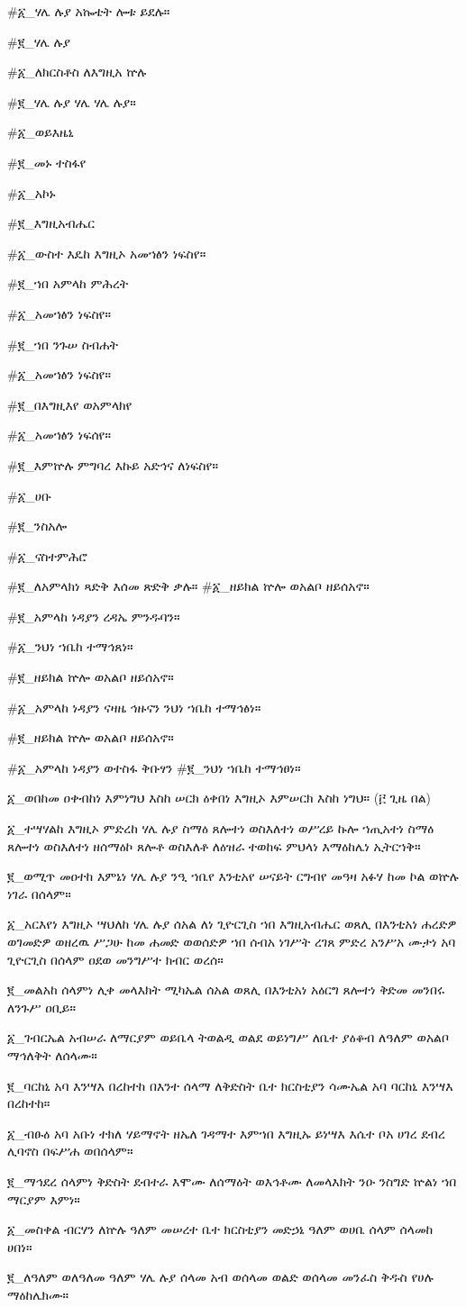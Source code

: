 #፩_ሃሌ ሉያ አኰቴት ሎቱ ይደሉ።
 
#፪_ሃሌ ሉያ

#፩_ለክርስቶስ ለእግዚአ ኵሉ 

#፪_ሃሌ ሉያ ሃሌ ሃሌ ሉያ።

#፩_ወይእዜኒ 

#፪_መኑ ተስፋየ

#፩_አኮኑ 

#፪_እግዚአብሔር

#፩_ውስተ እዴከ እግዚኦ አመኀፅን ነፍስየ። 

#፪_ኀበ አምላከ ምሕረት

#፩_አመኀፅን ነፍስየ። 

#፪_ኀበ ንጉሠ ስብሐት 

#፩_አመኀፅን ነፍስየ። 

#፪_በእግዚእየ ወአምላክየ

#፩_አመኀፅን ነፍሰየ።

#፪_እምኵሉ ምግባረ እኩይ አድኅና ለነፍስየ። 

#፩_ሀቡ 

#፪_ንስአሎ 

#፩_ናስተምሕሮ

#፪_ለአምላክነ ጻድቅ እሰመ ጽድቅ ቃሉ።
#፩_ዘይክል ኵሎ ወአልቦ ዘይሰአኖ። 

#፪_አምላከ ነዳያን ረዳኤ ምንዱባን። 

#፩_ንህነ ኀቤከ ተማኅጸነ።

#፪_ዘይክል ኵሎ ወአልቦ ዘይሰአኖ። 

#፩_አምላከ ነዳያን ናዛዜ ኅዙናን ንህነ ኀቤከ ተማኅፅነ።

#፪_ዘይክል ኵሎ ወአልቦ ዘይሰአኖ።

#፩_አምላከ ነዳያን ወተስፋ ቅቡፃን
#፪_ንህነ ኀቤከ ተማኅፀነ።

፩_ወበከመ ዐቀብከነ እምነግህ እስከ ሠርክ ዕቀበነ እግዚኦ እምሠርክ እስከ ነግህ። (፫ ጊዜ በል)

፩_ተሣሃልከ እግዚኦ ምድረከ ሃሌ ሉያ ስማዕ ጸሎተነ ወስእለተነ ወሥረይ ኩሎ ኀጢአተነ ስማዕ ጸሎተነ ወስእለተነ ዘሰማዕኮ ጸሎቶ ወስእለቶ ለዕዝራ ተወከፍ ምህላነ እማዕከሌነ ኢትርኀቅ።

፪_ወሚጥ መዐተከ እምኔነ ሃሌ ሉያ ንዒ ኀቤየ እንቲአየ ሠናይት ርግብየ መዓዛ አፉሃ ከመ ኮል ወኵሉ ነገራ በሰላም።

፩_አርእየነ እግዚኦ ሣህለከ ሃሌ ሉያ ሰአል ለነ ጊዮርጊስ ኀበ እግዚአብሔር ወጸሊ በእንቲአነ ሐረድዎ ወገመድዎ ወዘረዉ ሥጋሁ ከመ ሐመድ ወወሰድዎ ኀበ ሰብአ ነገሥት ረገጸ ምድረ አንሥአ ሙታነ አባ ጊዮርጊስ በሰላም ዐደወ መንግሥተ ክብር ወረሰ።

፪_መልአከ ሰላምነ ሊቀ መላእክት ሚካኤል ሰአል ወጸሊ በእንቲአነ አዕርግ ጸሎተነ ቅድመ መንበሩ ለንጉሥ ዐቢይ።

፩_ገብርኤል አብሠራ ለማርያም ወይቤላ ትወልዲ ወልደ ወይነግሥ ለቤተ ያዕቆብ ለዓለም ወአልቦ ማኅለቅት ለሰላሙ።

 ፪_ባርከኒ አባ እንሣእ በረከተከ በእንተ ሰላማ ለቅድስት ቤተ ክርስቲያን ሳሙኤል አባ ባርከኒ እንሣእ በረከተከ።

፩_ብፁዕ አባ አቡነ ተክለ ሃይማኖት ዘኤለ ገዳማተ እምኀበ እግዚኡ ይነሣእ እሴተ ቦአ ሀገረ ደብረ ሊባኖስ በፍሥሐ ወበሰላም።

፪_ማኅደረ ሰላምነ ቅድስት ደብተራ እሞሙ ለሰማዕት ወእኅቶሙ ለመላእክት ንዑ ንስግድ ኵልነ ኀበ ማርያም እምነ።

፩_መስቀል ብርሃን ለኵሉ ዓለም መሠረተ ቤተ ክርስቲያን መድኃኔ ዓለም ወሀቤ ሰላም ሰላመከ ሀበነ።

፪_ለዓለም ወለዓለመ ዓለም ሃሌ ሉያ ሰላመ አብ ወሰላመ ወልድ ወሰላመ መንፈስ ቅዱስ የሀሉ ማዕከሌክሙ።